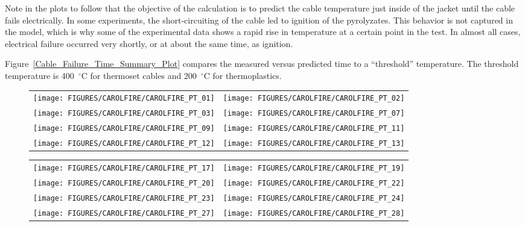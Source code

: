 Note in the plots to follow that the objective of the calculation is to predict the cable temperature just inside of the jacket until the cable fails electrically. In some experiments, the short-circuiting of the cable led to ignition of the pyrolyzates. This behavior is not captured in the model, which is why some of the experimental data shows a rapid rise in temperature at a certain point in the test. In almost all cases, electrical failure occurred very shortly, or at about the same time, as ignition.

Figure~\ref{Cable_Failure_Time_Summary_Plot} compares the measured versus predicted time to a ``threshold'' temperature. The threshold temperature is 400~$^\circ$C for thermoset cables and 200~$^\circ$C for thermoplastics.

\newpage

\begin{figure}[p]
\begin{tabular*}{\textwidth}{l@{\extracolsep{\fill}}r}
\texttt{[image: FIGURES/CAROLFIRE/CAROLFIRE\_PT\_01]} &
\texttt{[image: FIGURES/CAROLFIRE/CAROLFIRE\_PT\_02]} \\
\texttt{[image: FIGURES/CAROLFIRE/CAROLFIRE\_PT\_03]} &
\texttt{[image: FIGURES/CAROLFIRE/CAROLFIRE\_PT\_07]} \\
\texttt{[image: FIGURES/CAROLFIRE/CAROLFIRE\_PT\_09]} &
\texttt{[image: FIGURES/CAROLFIRE/CAROLFIRE\_PT\_11]} \\
\texttt{[image: FIGURES/CAROLFIRE/CAROLFIRE\_PT\_12]} &
\texttt{[image: FIGURES/CAROLFIRE/CAROLFIRE\_PT\_13]}
\end{tabular*}
\label{CAROLFIRE_Thermoset_1}
\end{figure}

\begin{figure}[p]
\begin{tabular*}{\textwidth}{l@{\extracolsep{\fill}}r}
\texttt{[image: FIGURES/CAROLFIRE/CAROLFIRE\_PT\_17]} &
\texttt{[image: FIGURES/CAROLFIRE/CAROLFIRE\_PT\_19]} \\
\texttt{[image: FIGURES/CAROLFIRE/CAROLFIRE\_PT\_20]} &
\texttt{[image: FIGURES/CAROLFIRE/CAROLFIRE\_PT\_22]} \\
\texttt{[image: FIGURES/CAROLFIRE/CAROLFIRE\_PT\_23]} &
\texttt{[image: FIGURES/CAROLFIRE/CAROLFIRE\_PT\_24]} \\
\texttt{[image: FIGURES/CAROLFIRE/CAROLFIRE\_PT\_27]} &
\texttt{[image: FIGURES/CAROLFIRE/CAROLFIRE\_PT\_28]}
\end{tabular*}
\label{CAROLFIRE_Thermoset_2}
\end{figure}

